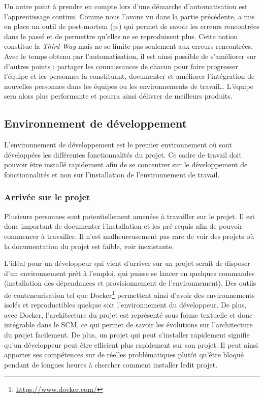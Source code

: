 Un autre point à prendre en compte lors d'une démarche d'automatisation est l'apprentissage continu. Comme nous l'avons vu dans la partie précédente, \etsy{} a mis en place un outil de post-mortem (p.\pageref{post-mortem}) qui permet de savoir les erreurs rencontrées dans le passé et de permettre qu'elles ne se reproduisent plus. Cette notion constitue la \emph{Third Way} mais ne se limite pas seulement aux erreurs rencontrées. Avec le temps obtenu par l'automatisation, il est ainsi possible de s'améliorer sur d'autres points : partager les connaissances de chacun pour faire progresser l'équipe et les personnes la constituant, documenter et améliorer l'intégration de nouvelles personnes dans les équipes ou les environnements de travail\ldots{} L'équipe sera alors plus performante et pourra ainsi délivrer de meilleurs produits.

\subsection{Environnement de développement}

L'environnement de développement est le premier environnement où sont développées les différentes fonctionnalités du projet. Ce cadre de travail doit pouvoir être installé rapidement afin de se concentrer sur le développement de fonctionnalités et non sur l'installation de l'environnement de travail.

\subsubsection{Arrivée sur le projet}

Plusieurs personnes sont potentiellement amenées à travailler sur le projet. Il est donc important de documenter l'installation et les pré-requis afin de pouvoir commencer à travailler. Il n'est malheureusement pas rare de voir des projets où la documentation du projet est faible, voir inexistante.

L'idéal pour un développeur qui vient d'arriver sur un projet serait de disposer d'un environnement prêt à l'emploi, qui puisse se lancer en quelques commandes (installation des dépendances et provisionnement de l'environnement). Des outils de conteneurisation tel que Docker\footnote{\url{https://www.docker.com/}} permettent ainsi d'avoir des environnements isolés et reproductibles quelque soit l'environnement du développeur. De plus, avec Docker, l'architecture du projet est représenté sous forme textuelle et donc intégrable dans le \gls{SCM}, ce qui permet de savoir les évolutions sur l'architecture du projet facilement. De plus, un projet qui peut s'installer rapidement signifie qu'un développeur peut être efficient plus rapidement sur son projet. Il peut ainsi apporter ses compétences sur de réelles problématiques plutôt qu'être bloqué pendant de longues heures à chercher comment installer ledit projet.

